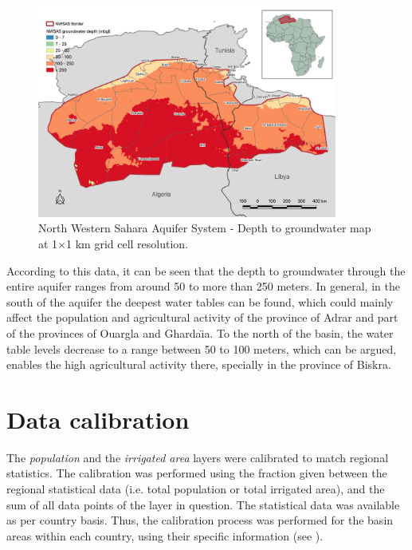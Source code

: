 \documentclass[12pt]{iopart}
\begin{document}
\begin{figure}[!ht]
	\centering
	\includegraphics[width=0.88\textwidth, cfbox=black 1pt 0pt]{NWSAS_Depth}
	\caption[NWSAS depth to groundwater map]{North Western Sahara Aquifer System - Depth to groundwater map at 1$\times$1 km grid cell resolution.}
	\label{fig:depth}
\end{figure}

According to this data, it can be seen that the depth to groundwater through the entire aquifer ranges from around 50 to more than 250 meters. In general, in the south of the aquifer the deepest water tables can be found, which could mainly affect the population and agricultural activity of the province of Adrar and part of the provinces of Ouargla and Gharda\"\i a. To the north of the basin, the water table levels decrease to a range between 50 to 100 meters, which can be argued, enables the high agricultural activity there, specially in the province of Biskra.

\section{Data calibration}
The \textit{population} and the \textit{irrigated area} layers were calibrated to match regional statistics. The calibration was performed using the fraction given between the regional statistical data (i.e. total population or total irrigated area), and the sum of all data points of the layer in question. The statistical data was available as per country basis. Thus, the calibration process was performed for the basin areas within each country, using their specific information (see ).
\end{document}

